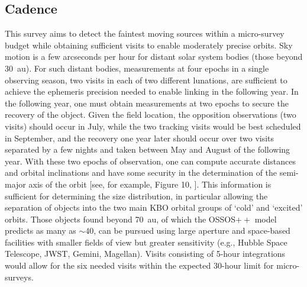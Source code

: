 \documentclass[modern,linenumbers,trackchanges,preprint]{aastex631}
\begin{document}
\subsection{Cadence}
This survey aims to detect the faintest moving sources within a micro-survey budget while obtaining sufficient visits to enable moderately precise orbits.
Sky motion is a few arcseconds per hour for distant solar system bodies (those beyond 30~au). 
For such distant bodies, measurements at four epochs in a single observing season, two visits in each of two different lunations, are sufficient to achieve the ephemeris precision needed to enable linking in the following year.  
In the following year, one must obtain measurements at two epochs to secure the recovery of the object.  
Given the field location, the opposition observations (two visits) should occur in July, while the two tracking visits would be best scheduled in September, and the recovery one year later should occur over two visits separated by a few nights and taken between May and August of the following year. 
With these two epochs of observation, one can compute accurate distances and orbital inclinations and have some security in the determination of the semi-major axis of the orbit [see, for example, Figure 10, \citet{Bannister2016}].
This information is sufficient for determining the size distribution, in particular allowing the separation of objects into the two main KBO orbital groups of `cold' and `excited' orbits.
Those objects found beyond 70~au, of which the OSSOS$++$ model predicts as many as $\sim40$, can be pursued using large aperture and space-based facilities with smaller fields of view but greater sensitivity (e.g., Hubble Space Telescope, JWST, Gemini, Magellan).
Visits consisting of 5-hour integrations would allow for the six needed visits within the expected 30-hour limit for micro-surveys. 
\end{document}
